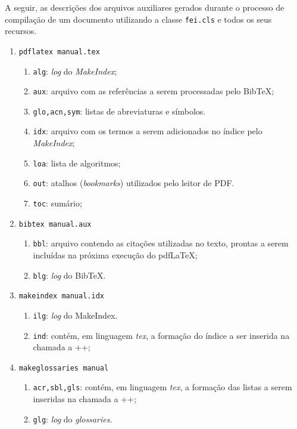 \documentclass[xindy,draft]{fei}
\begin{document}
	A seguir, as descrições dos arquivos auxiliares gerados durante o processo de compilação de um documento utilizando a classe \texttt{fei.cls} e todos os seus recursos.
		
	\begin{enumerate}
	
	\item\verb+pdflatex manual.tex+
	\begin{enumerate}
	\item \texttt{alg}: \emph{log} do \emph{MakeIndex};
	\item \texttt{aux}: arquivo com as referências a serem processadas pelo Bib\TeX;
	\item \texttt{glo,acn,sym}: listas de abreviaturas e símbolos.
	\item \texttt{idx}: arquivo com os termos a serem adicionados no índice pelo \emph{MakeIndex};
	\item \texttt{loa}: lista de algoritmos;
	\item \texttt{out}: atalhos (\emph{bookmarks}) utilizados pelo leitor de PDF.
	\item \texttt{toc}: sumário;
	\end{enumerate}	
	
	\item\verb+bibtex manual.aux+
	\begin{enumerate}
	\item \texttt{bbl}: arquivo contendo as citações utilizadas no texto, prontas a serem incluídas na próxima execução do pdf\LaTeX;
	\item \texttt{blg}: \emph{log} do Bib\TeX.
	\end{enumerate}	
	
	\item\verb+makeindex manual.idx+
	\begin{enumerate}
	\item \texttt{ilg}: \emph{log} do MakeIndex.
	\item \texttt{ind}: contém, em linguagem \emph{tex}, a formação do índice a ser inserida na chamada a \latexinline+\printindex+;
	\end{enumerate}	
	
	\item\verb+makeglossaries manual+
	\begin{enumerate}
	\item \texttt{acr,sbl,gls}:  contém, em linguagem \emph{tex}, a formação das listas a serem inseridas na chamada a \latexinline+\printglossaries+;
	\item \texttt{glg}: \emph{log} do \emph{glossaries}.
	\end{enumerate}
	\end{enumerate}
	
\end{document}

